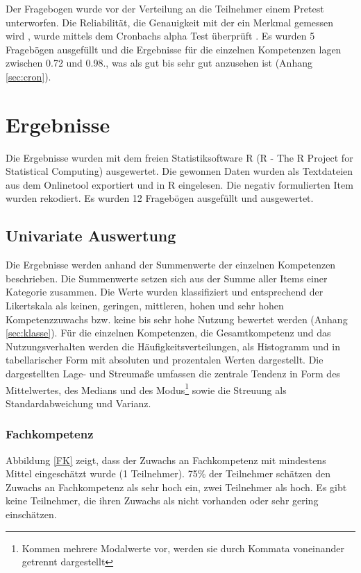 \documentclass[12pt,smallheadings, bibliography=totoc]{scrartcl}
\begin{document}
Der Fragebogen wurde vor der Verteilung an die Teilnehmer einem Pretest
unterworfen. Die Reliabilität, die Genauigkeit mit der ein Merkmal
gemessen wird \parencite[5]{rammstedt2004bestimmung}, wurde mittels dem
Cronbachs alpha Test überprüft \parencite{Wassa}. Es wurden 5 Fragebögen
ausgefüllt und die Ergebnisse für die einzelnen Kompetenzen lagen
zwischen 0.72 und 0.98., was als gut bis sehr gut anzusehen ist (Anhang
\ref{sec:cron}).

\section{Ergebnisse}\label{ergebnisse}

Die Ergebnisse wurden mit dem freien Statistiksoftware R (R - The R
Project for Statistical Computing) ausgewertet. Die gewonnen Daten
wurden als Textdateien aus dem Onlinetool exportiert und in R
eingelesen. Die negativ formulierten Item wurden rekodiert. Es wurden 12
Fragebögen ausgefüllt und ausgewertet.

\subsection{Univariate Auswertung}\label{univariate-auswertung}

Die Ergebnisse werden anhand der Summenwerte der einzelnen Kompetenzen
beschrieben. Die Summenwerte setzen sich aus der Summe aller Items einer
Kategorie zusammen. Die Werte wurden klassifiziert und entsprechend der
Likertskala als keinen, geringen, mittleren, hohen und sehr hohen
Kompetenzzuwachs bzw. keine bis sehr hohe Nutzung bewertet werden
(Anhang \ref{sec:klasse}). Für die einzelnen Kompetenzen, die
Gesamtkompetenz und das Nutzungsverhalten werden die
Häufigkeitsverteilungen, als Histogramm und in tabellarischer Form mit
absoluten und prozentalen Werten dargestellt. Die dargestellten Lage-
und Streumaße umfassen die zentrale Tendenz in Form des Mittelwertes,
des Medians und des
Modus\footnote{Kommen mehrere Modalwerte vor, werden sie durch Kommata voneinander getrennt dargestellt}
sowie die Streuung als Standardabweichung und Varianz.

\subsubsection{Fachkompetenz}\label{fachkompetenz}

Abbildung \ref{FK} zeigt, dass der Zuwachs an Fachkompetenz mit
mindestens Mittel eingeschätzt wurde (1 Teilnehmer). 75\% der Teilnehmer
schätzen den Zuwachs an Fachkompetenz als sehr hoch ein, zwei Teilnehmer
als hoch. Es gibt keine Teilnehmer, die ihren Zuwachs als nicht
vorhanden oder sehr gering einschätzen.
\end{document}
